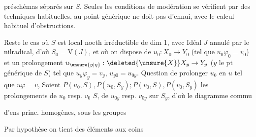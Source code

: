 
préschémas   séparés sur $S$. Seules les  conditions de modération se vérifient par des techniques habituelles.   au point générique ne doit pas  d'ennui, avec le calcul habituel d'obstructions.

Reste le cas où $S$ est local noeth irréductible de dim 1, avec Idéal $J$ annulé par le nilradical, d'où $S_0=\mathrm V(J)$, et où on dispose de $u_0:X_0\to Y_0$ (tel que $u_0\varphi_0=v_0$) et un prolongement $u_{\unsure{y|\eta}}:\deleted{\unsure{X}}X_y\to Y_y$ ($y$ le pt générique de $S$) tel que $u_y\varphi_y=v_y$, $u_{y0}=u_{0y}$. Question de prolonger $u_0$ en $u$ tel que $u\varphi=v$,  Soient $P(u_0,S),P(u_0,S_y);P(v_0,S),P(v_0,S_y)$ les prolongements de $u_0$ resp. $v_0$  $S$,  de $u_{0y}$ resp. $v_{0y}$ sur $S_y$, d'où le diagramme commu

d'ens  princ. homogènes, sous les groupes

Par hypothèse on tient des éléments aux coins
